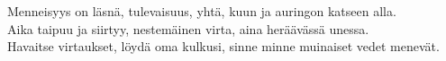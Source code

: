 \documentclass{article}
\begin{document}
\begin{infobox}
Menneisyys on läsnä, tulevaisuus, yhtä, kuun ja auringon katseen alla.\\
Aika taipuu ja siirtyy, nestemäinen virta, aina heräävässä unessa.\\
Havaitse virtaukset, löydä oma kulkusi, sinne minne muinaiset vedet menevät.
\end{infobox}
\end{document}
